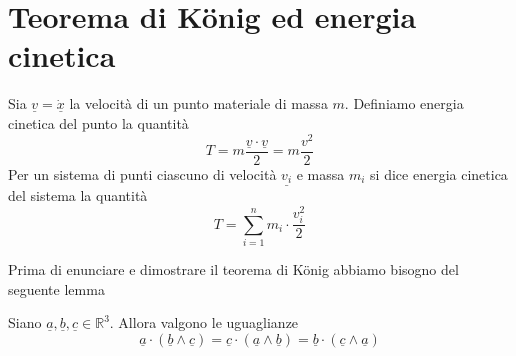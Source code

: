 \chapter{Teorema di König ed energia cinetica}
\begin{definition}{}
Sia \(\underline{v}=\dot{\underline{x}}\) la velocità di un punto materiale di massa \(m\). Definiamo energia cinetica del punto la quantità
\[
T=m\frac{\underline{v}\cdot\underline{v}}{2}=m\frac{v^2}{2}
\]
Per un sistema di punti ciascuno di velocità \(\underline{v_i}\) e massa \(m_i\) si dice energia cinetica del sistema la quantità
\[
T=\sum_{i=1}^{n} m_i\cdot\frac{v_i^2}{2}
\]
\end{definition}
Prima di enunciare e dimostrare il teorema di König abbiamo bisogno del seguente lemma

\begin{lemma}{}
Siano \(\underline{a},\underline{b},\underline{c}\in\mathbb{R}^3\). Allora valgono le uguaglianze
\[
\underline{a}\cdot(\underline{b}\wedge\underline{c})=\underline{c}\cdot(\underline{a}\wedge\underline{b})=\underline{b}\cdot(\underline{c}\wedge\underline{a})
\]
\end{lemma}

